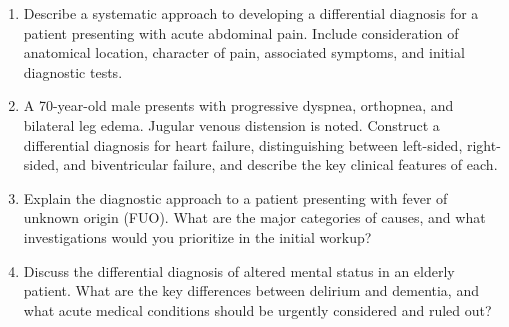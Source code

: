 \documentclass[11pt]{article}
\begin{document}
\begin{enumerate}[label=\textbf{\arabic*.}]
  \item Describe a systematic approach to developing a differential diagnosis for a patient presenting 
  with acute abdominal pain. Include consideration of anatomical location, character of pain, associated 
  symptoms, and initial diagnostic tests.

  \item A 70-year-old male presents with progressive dyspnea, orthopnea, and bilateral leg edema. 
  Jugular venous distension is noted. Construct a differential diagnosis for heart failure, distinguishing 
  between left-sided, right-sided, and biventricular failure, and describe the key clinical features 
  of each.

  \item Explain the diagnostic approach to a patient presenting with fever of unknown origin (FUO). 
  What are the major categories of causes, and what investigations would you prioritize in the initial 
  workup?

  \item Discuss the differential diagnosis of altered mental status in an elderly patient. What are 
  the key differences between delirium and dementia, and what acute medical conditions should be 
  urgently considered and ruled out?

\end{enumerate}
\end{document}
